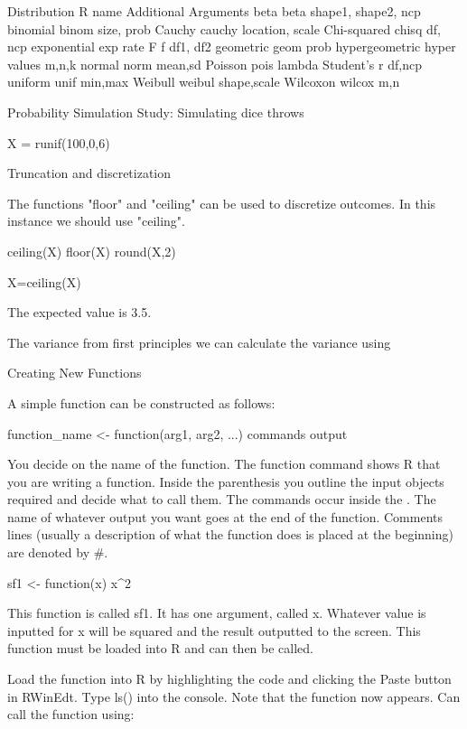 \begin{frame}
\begin{frame}
Distribution
R name
Additional Arguments
beta
beta
shape1, shape2, ncp
binomial
binom
size, prob
Cauchy
cauchy
location, scale
Chi-squared
chisq
df, ncp
exponential
exp
rate
F
f
df1, df2
geometric
geom
prob
hypergeometric
hyper
values m,n,k
normal
norm
mean,sd
Poisson
pois
lambda
Student's
r
df,ncp
uniform
unif
min,max
Weibull
weibul
shape,scale
Wilcoxon
wilcox
m,n






Probability
 Simulation Study: Simulating dice throws

  


X = runif(100,0,6)

Truncation and discretization

The functions "floor" and "ceiling" can be used to discretize outcomes. In this instance we should use "ceiling".

ceiling(X)
floor(X)
round(X,2)

X=ceiling(X)

 

The expected value is 3.5.

The variance from first principles we can calculate the variance using
  





 

Creating New Functions
 
A simple function can be constructed as follows:

 
function_name <- function(arg1, arg2, ...){
commands
output
}

 
You decide on the name of the function.
The function command shows R that you are writing a function.
Inside the parenthesis you outline the input objects required and decide what to call them.
The commands occur inside the { }.
The name of whatever output you want goes at the end of the function.
Comments lines (usually a description of what the function does is placed at the beginning) are denoted by #.
 


sf1 <- function(x){
x^2
}


This function is called sf1. It has one argument, called x. Whatever value is inputted for x will be squared and the result outputted to the screen. This function must be loaded into R and can then be called.

 
Load the function into R by highlighting the code and clicking the Paste button in RWinEdt.
Type ls() into the console. Note that the function now appears. Can call the function using:
 



\end{frame}
\end{frame}
